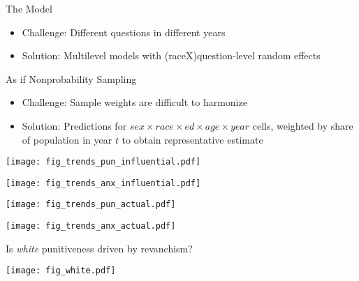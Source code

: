 \documentclass{beamer}
\begin{document}
\begin{frame}{The Model} 
\begin{itemize}
    \item[] \alert{Challenge:} Different questions in different years
    \item[] \alert{Solution:} Multilevel models with (raceX)question-level random effects
\end{itemize}
\end{frame}

\begin{frame}{As if Nonprobability Sampling} 
\begin{itemize}
    \item[] \alert{Challenge:} Sample weights are difficult to harmonize
    \item[] \alert{Solution:} Predictions for $sex \times race \times ed \times age \times year$ cells, weighted by share of population in year $t$ to obtain representative estimate
\end{itemize}
\end{frame}

\begin{frame}{\claimthreeq}
\begin{center}
    \texttt{[image: fig\_trends\_pun\_influential.pdf]}
\end{center}
\end{frame}

\begin{frame}{\claimthreeq}
\begin{center}
    \texttt{[image: fig\_trends\_anx\_influential.pdf]}
\end{center}
\end{frame}

\begin{frame}{\claimthreeq}
\begin{center}
    \texttt{[image: fig\_trends\_pun\_actual.pdf]}
\end{center}
\end{frame}

\begin{frame}{\claimthreeq}
\begin{center}
    \texttt{[image: fig\_trends\_anx\_actual.pdf]}
\end{center}
\end{frame}

\begin{frame}{Is \textit{white} punitiveness driven by revanchism?} 
\begin{center}
    \texttt{[image: fig\_white.pdf]}
\end{center}
\end{frame}
\end{document}
